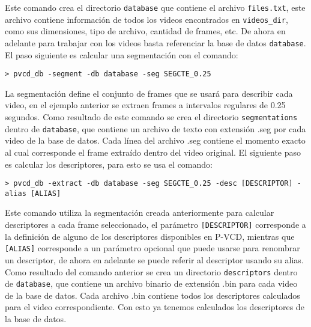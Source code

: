 Este comando crea el directorio \texttt{database} que contiene el archivo \texttt{files.txt}, este archivo contiene información de todos los videos encontrados en \texttt{videos\_dir}, como sus dimensiones, tipo de archivo, cantidad de frames, etc. De ahora en adelante para trabajar con los videos basta referenciar la base de datos \texttt{database}. El paso siguiente es calcular una segmentación con el comando:
\begin{lstlisting}[style=BashInputStyle]
    > pvcd_db -segment -db database -seg SEGCTE_0.25
\end{lstlisting}
La segmentación define el conjunto de frames que se usará para describir cada video, en el ejemplo anterior se extraen frames a intervalos regulares de 0.25 segundos. Como resultado de este comando se crea el directorio \texttt{segmentations} dentro de \texttt{database}, que contiene un archivo de texto con extensión .seg por cada video de la base de datos. Cada línea del archivo .seg contiene el momento exacto al cual corresponde el frame extraído dentro del video original.
El siguiente paso es calcular los descriptores, para esto se usa el comando:
\begin{lstlisting}[style=BashInputStyle]
    > pvcd_db -extract -db database -seg SEGCTE_0.25 -desc [DESCRIPTOR] -alias [ALIAS]
\end{lstlisting}

Este comando utiliza la segmentación creada anteriormente para calcular descriptores a cada frame seleccionado, el parámetro \texttt{[DESCRIPTOR]} corresponde a la definición de alguno de los descriptores disponibles en P-VCD, mientras que \texttt{[ALIAS]} corresponde a un parámetro opcional que puede usarse para renombrar un descriptor, de ahora en adelante se puede referir al descriptor usando su alias. Como resultado del comando anterior se crea un directorio \texttt{descriptors} dentro de \texttt{database}, que contiene un archivo binario de extensión .bin para cada video de la base de datos. Cada archivo .bin contiene todos los descriptores calculados para el video correspondiente. Con esto ya tenemos calculados los descriptores de la base de datos.\\

